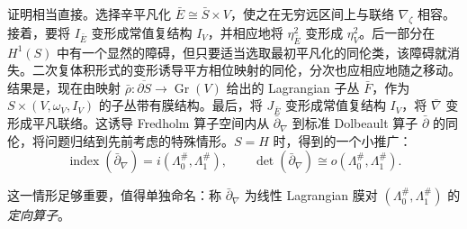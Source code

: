 证明相当直接。选择辛平凡化 $\bar E\cong\bar S\times V$，使之在无穷远区间上与联络 $\nabla_\zeta$ 相容。接着，要将 $I_{\bar E}$ 变形成常值复结构 $I_V$，并相应地将 $\eta_{\bar E}^2$ 变形成 $\eta_V^2$。后一部分在 $H^1(S)$ 中有一个显然的障碍，但只要适当选取最初平凡化的同伦类，该障碍就消失。二次复体积形式的变形诱导平方相位映射的同伦，分次也应相应地随之移动。结果是，现在由映射 $\bar\rho:\overline{\partial S}\to\operatorname{Gr}(V)$ 给出的 Lagrangian 子丛 $\bar F$，作为
$S\times(V,\allowbreak \omega_V,\allowbreak I_V)$ 的子丛带有膜结构。最后，将 $J_{\bar E}$ 变形成常值复结构 $I_V$，将 $\bar\nabla$ 变形成平凡联络。这诱导 Fredholm 算子空间内从 $\bar\partial_\nabla$ 到标准 Dolbeault 算子 $\bar\partial$ 的同伦，将问题归结到先前考虑的特殊情形。$S=H$ 时，得到的一个小推广：
\begin{equation}\label{eq:11.39}
\operatorname{index}(\bar\partial_\nabla)=i(\Lambda_0^\#,\Lambda_1^\#),\qquad
\det(\bar\partial_\nabla)\cong o(\Lambda_0^\#,\Lambda_1^\#).
\end{equation}
\begin{definition*}
这一情形足够重要，值得单独命名：称 $\bar\partial_\nabla$ 为线性 Lagrangian 膜对 $(\Lambda_0^\#,\allowbreak \Lambda_1^\#)$ 的\emph{定向算子}。
\end{definition*}
